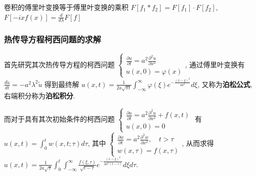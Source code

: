 \documentclass[10pt]{yerbaformat}
\begin{document}
\begin{lemma}
    卷积的傅里叶变换等于傅里叶变换的乘积 $F\left[f_{1} * f_{2}\right]=F\left[f_{1}\right] \cdot F\left[f_{2}\right]$, $F[-i x f(x)]=\frac{d}{d \lambda} F[f]$
\end{lemma}

\subsubsection{热传导方程柯西问题的求解} 

\par 首先研究其次热传导方程的柯西问题 $\left\{\begin{array}{l}\frac{\partial u}{\partial t}=a^{2} \frac{\partial^{2} u}{\partial x^{2}} \\ u(x, 0)=\varphi(x)\end{array}\right.$, 通过傅里叶变换有 $\frac{d \tilde{u}}{d t}=-a^{2} \lambda^{2} \tilde{u}$ 得到最终解 $u(x, t)=\frac{1}{2 a \sqrt{\pi t}} \int_{-\infty}^{\infty} \varphi(\xi) e^{-\frac{(x-\xi)^{2}}{4 a^{2}}} d \xi$, 又称为\textbf{泊松公式}, 右端积分称为\textbf{泊松积分}.

\par 而对于具有其次初始条件的柯西问题 $\left\{\begin{array}{l}\frac{\partial u}{\partial t}=a^{2} \frac{\partial^{2} u}{\partial x^{2}}+f(x, t) \\ u(x, 0)=0\end{array}\right.$ 有 $u(x, t)=\int_{0}^{t} w(x, t ; \tau) d \tau$, 其中 $\left\{\begin{array}{l}\frac{\partial w}{\partial t}=a^{2} \frac{\partial^{2} w}{\partial x^{2}}, \quad t>\tau \\ w(x, \tau)=f(x, \tau)\end{array}\right.$, 从而求得 $u(x, t)=\frac{1}{2 a \sqrt{\pi}} \int_{0}^{t} \int_{-\infty}^{\infty} \frac{f(\xi, \tau)}{\sqrt{t-\tau}} e^{-\frac{(x-\xi)^{2}}{4 a^{2}(t-\tau)}} d \xi d \tau$.

\end{document}
